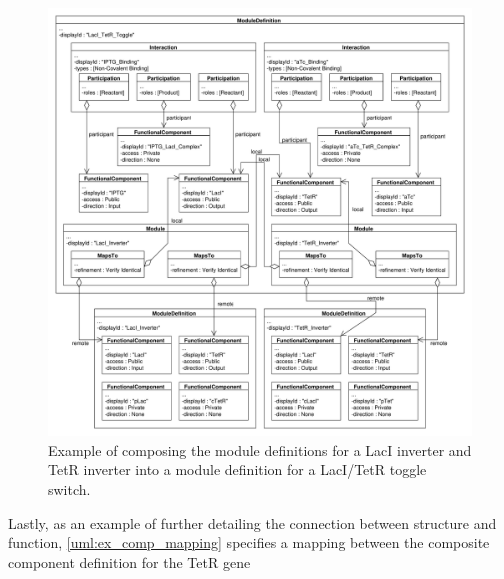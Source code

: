 \begin{figure}[ht]
\begin{center}
\includegraphics[width=\textwidth]{example_uml/toggle_4}
\caption[]{Example of composing the module definitions for a LacI inverter and TetR inverter into a module definition for a LacI/TetR toggle switch.}
\label{uml:ex_mod_def_compo}
\end{center}
\end{figure}

Lastly, as an example of further detailing the connection between structure and function, \ref{uml:ex_comp_mapping} specifies a mapping between the composite component definition for the TetR gene


